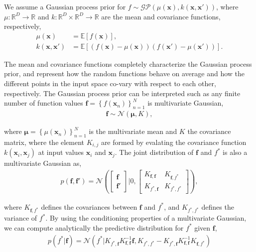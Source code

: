 \documentclass[]{interact}
\theoremstyle{plain}%
\theoremstyle{definition}
\theoremstyle{remark}
\begin{document}
We assume a Gaussian process prior for $f \sim \mathcal{GP}(\mu(\mathbf{x}), k(\mathbf{x}, \mathbf{x}'))$, where $\mu: \mathbb{R}^D \rightarrow \mathbb{R}$ and $k: \mathbb{R}^D \times \mathbb{R}^D \rightarrow \mathbb{R}$ are the mean and covariance functions, respectively,
%
\begin{align*}
 	\mu(\mathbf{x}) &= \mathbb{E}\!\left[f(\mathbf{x})\right],\\ 
 	k(\mathbf{x}, \mathbf{x}') &= \mathbb{E}\!\left[\left( f(\mathbf{x}) - \mu(\mathbf{x}) \right)\left( f(\mathbf{x}') - \mu(\mathbf{x}') \right)\right].
\end{align*} 

The mean and covariance functions completely characterize the Gaussian process prior, and represent how the random functions behave on average and how the different points in the input space co-vary with respect to each other, respectively. The Gaussian process prior can be interpreted such as any finite number of function values $\mathbf{f}=\left\lbrace f(\mathbf{x}_n) \right\rbrace_{n=1}^N$ is multivariate Gaussian, 
\begin{align*}
\mathbf{f} \sim \mathcal{N}(\boldsymbol{\mu},K),
\end{align*}

\noindent where $\boldsymbol{\mu} = \left\lbrace \mu(\mathbf{x}_n) \right\rbrace_{n=1}^N$ is the multivariate mean and $K$ the covariance matrix, where the element $K_{i,j}$ are formed by evalating the covariance function $k(\mathbf{x}_i,\mathbf{x}_j)$ at input values $\mathbf{x}_i$ and $\mathbf{x}_j$. The joint distribution of $\mathbf{f}$ and $f^*$ is also a multivariate Gaussian as,
%
\begin{eqnarray*}
p(\mathbf{f},\mathbf{f}')=\mathcal{N} \left( \left[ \begin{array}{cc}
\mathbf{f} \\ 
\mathbf{f}'
\end{array} \right] | 0,\left[ \begin{array}{cc}
K_{\mathbf{f},\mathbf{f}} & K_{\mathbf{f},f^*} \\ 
K_{f^*,\mathbf{f}} & K_{f^*,f^*}
\end{array} \right] \right),
\end{eqnarray*} 

\noindent where $K_{\mathbf{f},f^*}$ defines the covariances between $\mathbf{f}$ and $f^*$, and $K_{f^*,f^*}$ defines the variance of $f^*$. By using the conditioning properties of a multivariate Gaussian, we can compute analytically the predictive distribution for $f^*$  given $\mathbf{f}$,
\begin{align*}
	p(f^*| \mathbf{f}) = \mathcal{N}(f^*| K_{f^*,\mathbf{f}} K_{\mathbf{f},\mathbf{f}}^{-1} \mathbf{f},  K_{f^*,f^*}-K_{f^*,\mathbf{f}} K_{\mathbf{f},\mathbf{f}}^{-1} K_{\mathbf{f},f^*}  )
\end{align*}
\end{document}
